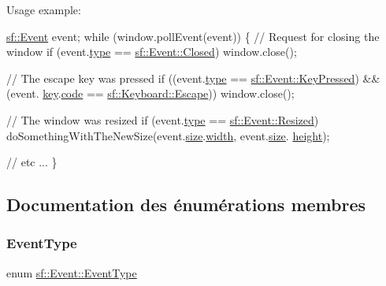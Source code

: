 Usage example\+: 
\begin{DoxyCode}
\hyperlink{classsf_1_1Event}{sf::Event} event;
\textcolor{keywordflow}{while} (window.pollEvent(event))
\{
    \textcolor{comment}{// Request for closing the window}
    \textcolor{keywordflow}{if} (event.\hyperlink{classsf_1_1Event_adf2f8044f713fd9d6019077b0d1ffe0a}{type} == \hyperlink{classsf_1_1Event_af41fa9ed45c02449030699f671331d4aa316e4212e083f1dce79efd8d9e9c0a95}{sf::Event::Closed})
        window.close();

    \textcolor{comment}{// The escape key was pressed}
    \textcolor{keywordflow}{if} ((event.\hyperlink{classsf_1_1Event_adf2f8044f713fd9d6019077b0d1ffe0a}{type} == \hyperlink{classsf_1_1Event_af41fa9ed45c02449030699f671331d4aac3c7abfaa98c73bfe6be0b57df09c71b}{sf::Event::KeyPressed}) && (event.
      \hyperlink{classsf_1_1Event_a45b92fc6757ca7c193f06b302e424ab0}{key}.\hyperlink{structsf_1_1Event_1_1KeyEvent_a2879fdab8a68cb1c6ecc45730a2d0e61}{code} == \hyperlink{classsf_1_1Keyboard_acb4cacd7cc5802dec45724cf3314a142a64b7ecb543c5d03bec8383dde123c95d}{sf::Keyboard::Escape}))
        window.close();

    \textcolor{comment}{// The window was resized}
    \textcolor{keywordflow}{if} (event.\hyperlink{classsf_1_1Event_adf2f8044f713fd9d6019077b0d1ffe0a}{type} == \hyperlink{classsf_1_1Event_af41fa9ed45c02449030699f671331d4aa67fd26d7e520bc6722db3ff47ef24941}{sf::Event::Resized})
        doSomethingWithTheNewSize(event.\hyperlink{classsf_1_1Event_a85dae56a377eeffd39183c3f6fc96cb9}{size}.\hyperlink{structsf_1_1Event_1_1SizeEvent_a20ea1b78c9bb1604432f8f0067bbfd94}{width}, event.\hyperlink{classsf_1_1Event_a85dae56a377eeffd39183c3f6fc96cb9}{size}.
      \hyperlink{structsf_1_1Event_1_1SizeEvent_af0f76a599d5f48189cb8d78d4e5facdb}{height});

    \textcolor{comment}{// etc ...}
\}
\end{DoxyCode}
 

\subsection{Documentation des énumérations membres}
\mbox{\label{classsf_1_1Event_af41fa9ed45c02449030699f671331d4a}} 
\subsubsection{\texorpdfstring{Event\+Type}{EventType}}
{\footnotesize\ttfamily enum \hyperlink{classsf_1_1Event_af41fa9ed45c02449030699f671331d4a}{sf\+::\+Event\+::\+Event\+Type}}



